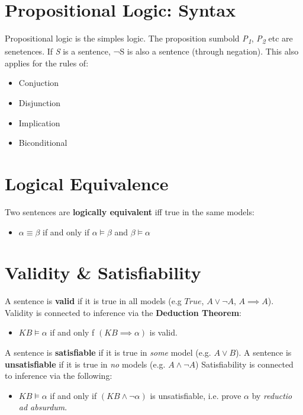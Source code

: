 \documentclass[11pt]{article}
\begin{document}
\section{Propositional Logic: Syntax}
\label{sec:orgfc5d0b1}
Propositional logic is the simples logic.
The proposition sumbold \emph{P\textsubscript{1}}, \emph{P\textsubscript{2}} etc are senetences.
If \emph{S} is a sentence, ¬S is also a sentence (through negation).
This also applies for the rules of:
\begin{itemize}
\item Conjuction
\item Disjunction
\item Implication
\item Biconditional
\end{itemize}

\section{Logical Equivalence}
\label{sec:org06d2780}
Two sentences are \textbf{logically equivalent} iff true in the same models:
\begin{itemize}
\item \(\alpha \equiv \beta\) if and only if \(\alpha \models \beta\) and \(\beta \models \alpha\)
\end{itemize}

\section{Validity \& Satisfiability}
\label{sec:orge996c99}
A sentence is \textbf{valid} if it is true in all models (e.g \(True\), \(A\lor\neg A\), \(A\implies A\)).
Validity is connected to inference via the \textbf{Deduction Theorem}:
\begin{itemize}
\item \(KB \models \alpha\) if and only f \((KB \implies \alpha)\) is valid.
\end{itemize}
A sentence is \textbf{satisfiable} if it is true in \emph{some} model (e.g. \(A\lor B\)).
A sentence is \textbf{unsatisfiable} if it is true in \emph{no} models (e.g. \(A\land \neg A\))
Satisfiability is connected to inference via the following:
\begin{itemize}
\item \(KB \models \alpha\) if and only if \((KB \land \neg \alpha)\) is unsatisfiable, i.e. prove \(\alpha\) by \emph{reductio ad absurdum}.
\end{itemize}
\end{document}
